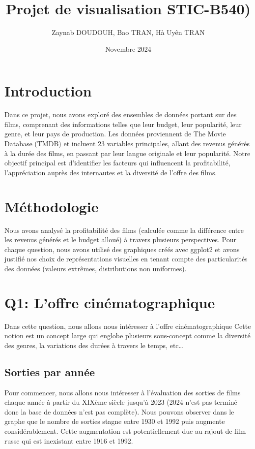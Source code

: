 \documentclass{article}
\title{Projet de visualisation STIC-B540)}
\author{Zaynab DOUDOUH, Bao TRAN, Hà Uyên TRAN }
\date{Novembre 2024}
\begin{document}
	
	\maketitle
	
\section{Introduction}
Dans ce projet, nous avons exploré des ensembles de données portant sur des films, comprenant des informations telles que leur budget, leur popularité, leur genre, et leur pays de production. Les données proviennent de The Movie Database (TMDB) et incluent 23 variables principales, allant des revenus générés à la durée des films, en passant par leur langue originale et leur popularité. Notre objectif principal est d'identifier les facteurs qui influencent la profitabilité, l'appréciation auprès des internautes et la diversité de l'offre des films.

\section{Méthodologie}
Nous avons analysé la profitabilité des films (calculée comme la différence entre les revenus générés et le budget alloué) à travers plusieurs perspectives. Pour chaque question, nous avons utilisé des graphiques créés avec ggplot2 et avons justifié nos choix de représentations visuelles en tenant compte des particularités des données (valeurs extrêmes, distributions non uniformes).

\section*{Q1: L'offre cinématographique}
Dans cette question, nous allons nous intéresser à l’offre cinématographique Cette notion est un concept large qui englobe plusieurs sous-concept comme la diversité des genres, la variations des durées à travers le temps, etc…

\subsection*{Sorties par année}
Pour commencer, nous allons nous intéresser à l’évaluation des sorties de films chaque année à partir du XIXème siècle jusqu’à 2023 (2024 n’est pas terminé donc la base de données n’est pas complète). Nous pouvons observer dans le graphe que le nombre de sorties stagne entre 1930 et 1992 puis augmente considérablement. Cette augmentation est potentiellement due au rajout de film russe qui est inexistant entre 1916 et 1992. 
\end{document}
